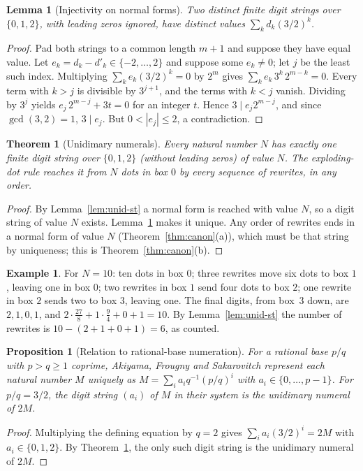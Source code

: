 \documentclass[11pt]{article}
\theoremstyle{definition}
\newtheorem{example}[definition]{Example}
\theoremstyle{plain}
\newtheorem{theorem}[definition]{Theorem}
\newtheorem{proposition}[definition]{Proposition}
\newtheorem{lemma}[definition]{Lemma}
\theoremstyle{remark}
\begin{document}
\begin{lemma}[Injectivity on normal forms]\label{lem:unid-inj}
Two distinct finite digit strings over $\{0,1,2\}$, with leading zeros ignored, have distinct values $\sum_kd_k(3/2)^k$.
\end{lemma}
\begin{proof}
Pad both strings to a common length $m+1$ and suppose they have equal value. Let $e_k=d_k-d'_k\in\{-2,\dots,2\}$ and suppose some $e_k\ne0$; let $j$ be the least such index. Multiplying $\sum_ke_k(3/2)^k=0$ by $2^m$ gives $\sum_ke_k\,3^k\,2^{m-k}=0$. Every term with $k>j$ is divisible by $3^{j+1}$, and the terms with $k<j$ vanish. Dividing by $3^j$ yields $e_j\,2^{m-j}+3t=0$ for an integer $t$. Hence $3\mid e_j2^{m-j}$, and since $\gcd(3,2)=1$, $3\mid e_j$. But $0<|e_j|\le2$, a contradiction.
\end{proof}

\begin{theorem}[Unidimary numerals]\label{thm:unid}
Every natural number $N$ has exactly one finite digit string over $\{0,1,2\}$ (without leading zeros) of value $N$. The exploding-dot rule reaches it from $N$ dots in box $0$ by every sequence of rewrites, in any order.
\end{theorem}
\begin{proof}
By Lemma~\ref{lem:unid-st} a normal form is reached with value $N$, so a digit string of value $N$ exists. Lemma~\ref{lem:unid-inj} makes it unique. Any order of rewrites ends in a normal form of value $N$ (Theorem~\ref{thm:canon}(a)), which must be that string by uniqueness; this is Theorem~\ref{thm:canon}(b).
\end{proof}

\begin{example}\label{ex:unid10}
For $N=10$: ten dots in box $0$; three rewrites move six dots to box $1$, leaving one in box $0$; two rewrites in box $1$ send four dots to box $2$; one rewrite in box $2$ sends two to box $3$, leaving one. The final digits, from box~$3$ down, are $2,1,0,1$, and $2\cdot\tfrac{27}{8}+1\cdot\tfrac94+0+1=10$. By Lemma~\ref{lem:unid-st} the number of rewrites is $10-(2+1+0+1)=6$, as counted.
\end{example}

\begin{proposition}[Relation to rational-base numeration]\label{prop:afs}
For a rational base $p/q$ with $p>q\ge1$ coprime, Akiyama, Frougny and Sakarovitch \cite{AFS08} represent each natural number $M$ uniquely as $M=\sum_ia_iq^{-1}(p/q)^i$ with $a_i\in\{0,\dots,p-1\}$. For $p/q=3/2$, the digit string $(a_i)$ of $M$ in their system is the unidimary numeral of $2M$.
\end{proposition}
\begin{proof}
Multiplying the defining equation by $q=2$ gives $\sum_ia_i(3/2)^i=2M$ with $a_i\in\{0,1,2\}$. By Theorem~\ref{thm:unid}, the only such digit string is the unidimary numeral of $2M$.
\end{proof}
\end{document}
